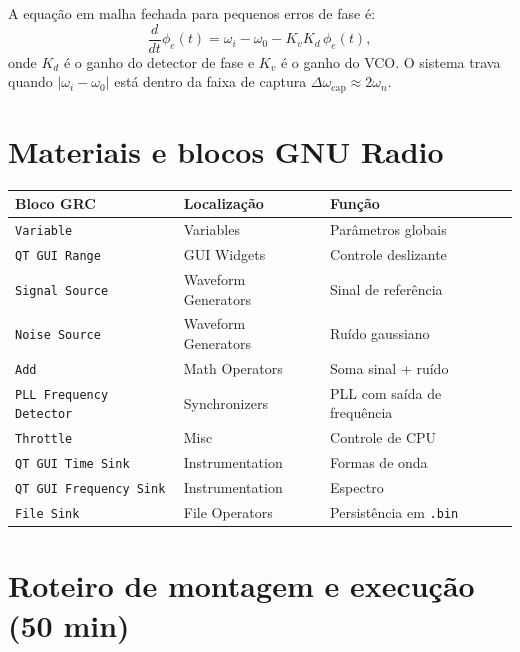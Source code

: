 \documentclass[11pt,a4paper]{article}
\begin{document}
A equação em malha fechada para pequenos erros de fase é:
\begin{equation}
  \frac{d}{dt}\phi_e(t) = \omega_i - \omega_0 - K_v K_d\,\phi_e(t),
\end{equation}
onde $K_d$ é o ganho do detector de fase e $K_v$ é o ganho do VCO.
O sistema trava quando $|\omega_i - \omega_0|$ está dentro da faixa de
captura $\Delta\omega_\text{cap} \approx 2\omega_n$.

\section{Materiais e blocos GNU Radio}

\begin{center}
  \begin{tabular}{l l l}
    \toprule
    Bloco GRC & Localização & Função \\
    \midrule
    \texttt{Variable}               & Variables           & Parâmetros globais \\
    \texttt{QT GUI Range}           & GUI Widgets         & Controle deslizante \\
    \texttt{Signal Source}          & Waveform Generators & Sinal de referência \\
    \texttt{Noise Source}           & Waveform Generators & Ruído gaussiano \\
    \texttt{Add}                    & Math Operators      & Soma sinal + ruído \\
    \texttt{PLL Frequency Detector} & Synchronizers       & PLL com saída de frequência \\
    \texttt{Throttle}               & Misc                & Controle de CPU \\
    \texttt{QT GUI Time Sink}       & Instrumentation     & Formas de onda \\
    \texttt{QT GUI Frequency Sink}  & Instrumentation     & Espectro \\
    \texttt{File Sink}              & File Operators      & Persistência em \texttt{.bin} \\
    \bottomrule
  \end{tabular}
\end{center}

\section{Roteiro de montagem e execução (50 min)}
\end{document}
